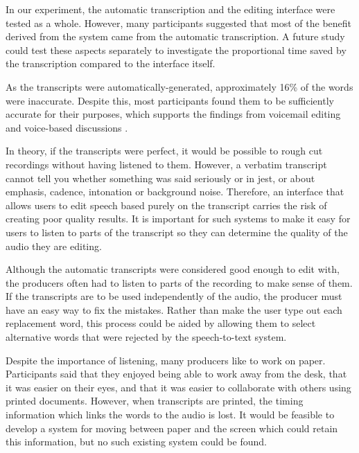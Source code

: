 In our experiment, the automatic transcription and the editing interface were tested as a whole. However, many
participants suggested that most of the benefit derived from the system came from the automatic transcription. A future
study could test these aspects separately to investigate the proportional time saved by the transcription compared to
the interface itself.

As the transcripts were automatically-generated, approximately 16\% of the words were inaccurate. Despite this, most
participants found them to be sufficiently accurate for their purposes, which supports the findings from voicemail
editing \citep{Whittaker2004} and voice-based discussions \citep{Sivaraman2016}. 

In theory, if the transcripts were perfect, it would be possible to rough cut recordings without having listened to
them. However, a verbatim transcript cannot tell you whether something was said seriously or in jest, or about
emphasis, cadence, intonation or background noise. Therefore, an interface that allows users to edit speech based
purely on the transcript carries the risk of creating poor quality results. It is important for such systems to make it
easy for users to listen to parts of the transcript so they can determine the quality of the audio they are editing.

Although the automatic transcripts were considered good enough to edit with, the producers often had to listen to parts
of the recording to make sense of them. If the transcripts are to be used independently of the audio, the producer must
have an easy way to fix the mistakes. Rather than make the user type out each replacement word, this process could be
aided by allowing them to select alternative words that were rejected by the speech-to-text system.

Despite the importance of listening, many producers like to work on paper.  Participants said that they enjoyed being
able to work away from the desk, that it was easier on their eyes, and that it was easier to collaborate with others
using printed documents. However, when transcripts are printed, the timing information which links the words to the
audio is lost. It would be feasible to develop a system for moving between paper and the screen which could retain this
information, but no such existing system could be found.

